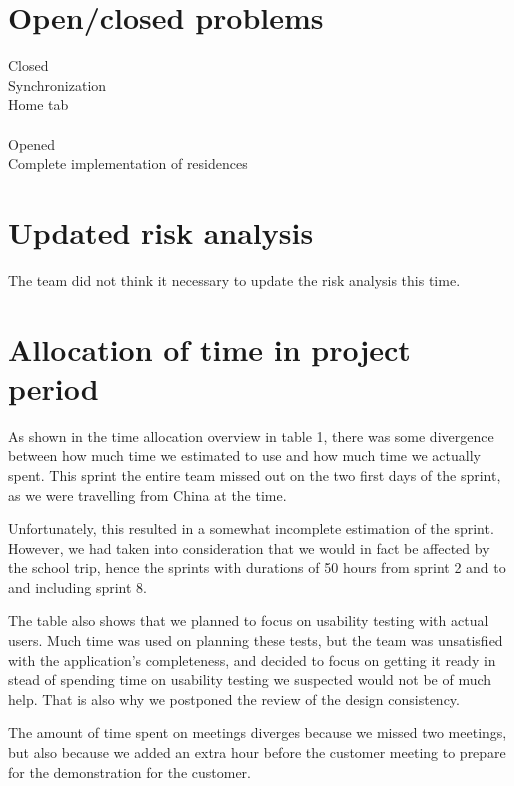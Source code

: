 \documentclass[12pt]{article}
\begin{document}
\section{Open/closed problems}
Closed \\
Synchronization\\
Home tab\\\\
Opened \\
Complete implementation of residences

\section{Updated risk analysis}
The team did not think it necessary to update the risk analysis this time.


\section{Allocation of time in project period}
As shown in the time allocation overview in table 1, there was some divergence between how much time we estimated to use and how much time we actually spent. This sprint the entire team missed out on the two first days of the sprint, as we were travelling from China at the time. 

Unfortunately, this resulted in a somewhat incomplete estimation of the sprint. However, we had taken into consideration that we would in fact be affected by the school trip, hence the sprints with durations of 50 hours from sprint 2 and to and including sprint 8.

The table also shows that we planned to focus on usability testing with actual users. Much time was used on planning these tests, but the team was unsatisfied with the application's completeness, and decided to focus on getting it ready in stead of spending time on usability testing we suspected would not be of much help. That is also why we postponed the review of the design consistency.

The amount of time spent on meetings diverges because we missed two meetings, but also because we added an extra hour before the customer meeting to prepare for the demonstration for the customer.
\end{document}
